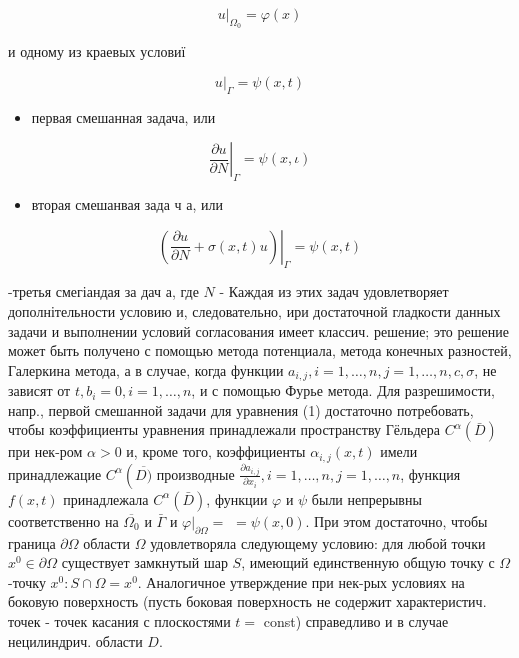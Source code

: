 \documentclass[10pt]{article}
\begin{document}
\[

\left.u\right|_{\Omega_{0}}=\varphi(x)

\]



и одному из краевых условиї



\[

\left.u\right|_{\Gamma}=\psi(x, t)

\]



\begin{itemize}

  \item первая смешанная задача, или

\end{itemize}



\[

\left.\frac{\partial u}{\partial N}\right|_{\Gamma}=\psi(x, \iota)

\]



\begin{itemize}

  \item вторая смешанвая зада ч а, или

\end{itemize}



\[

\left.\left(\frac{\partial u}{\partial N}+\sigma(x, t) u\right)\right|_{\Gamma}=\psi(x, t)

\]



-третья смегіандая за дач а, где $N$ - Каждая из этих задач удовлетворяет дополнітельности условию и, следовательно, ири достаточной гладкости данных задачи и выполнении условий согласования имеет классич. решение; это решение может быть получено с помощью метода потенциала, метода конечных разностей, Галеркина метода, а в случае, когда функции $a_{i, j}, i=1, \ldots, n, j=1, \ldots, n, c, \sigma$, не зависят от $t, b_{i}=0, i=1, \ldots, n$, и с помощью Фурье метода. Для разрешимости, напр., первой смешанной задачи для уравнения (1) достаточно потребовать, чтобы коэффициенты уравнения принадлежали пространству Гёльдера $C^{\alpha}(\bar{D})$ при нек-ром $\alpha>0$ и, кроме того, коэффициенты $\alpha_{i, j}(x, t)$ имели принадлежацие $C^{\alpha}\left(\overline{D)}\right.$ производные $\frac{\partial a_{i, j}}{\partial x_{i}}, i=1, \ldots, n, j=1, \ldots, n$, функция $f(x, t)$ принадлежала $C^{\alpha}(\bar{D})$, функции $\varphi$ и $\psi$ были непрерывны соответственно на $\overline{\Omega_{0}}$ и $\bar{\Gamma}$ и $\left.\varphi\right|_{\partial \Omega}=$ $=\psi(x, 0)$. При этом достаточно, чтобы граница $\partial \Omega$ области $\Omega$ удовлетворяла следующему условию: для любой точки $x^{0} \in \partial \Omega$ существует замкнутый шар $S$, имеющий единственную общую точку с $\Omega$-точку $x^{0}: S \cap \Omega=x^{0}$. Аналогичное утверждение при нек-рых условиях на боковую поверхность (пусть боковая поверхность не содержит характеристич. точек - точек касания с плоскостями $t=$ const) справедливо и в случае нецилиндрич. области $D$.
\end{document}
